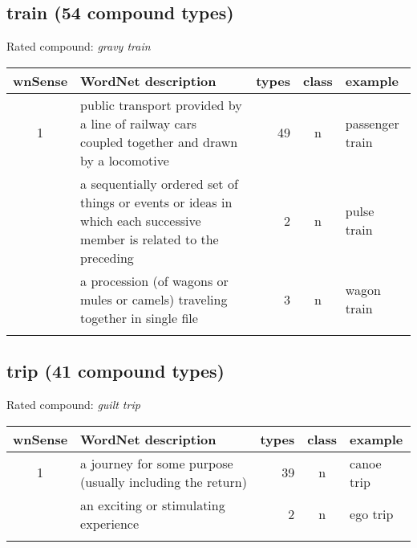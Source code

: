 \subsection{train     (54 compound types)}
Rated compound: \emph{gravy train}
\vspace*{-.3cm}

\noindent
\begin{longtable}{c>{\raggedright\arraybackslash}p{5cm}rc>{\raggedright\arraybackslash}p{2cm}}\lsptoprule
{\small wnSense}&WordNet description&types&class&example\\\midrule
1&public transport provided by a line of railway cars coupled together and drawn by a locomotive&49&n&passenger train\\\tablevspace
2&a sequentially ordered set of things or events or ideas in which each successive member is related to the preceding&2&n&pulse train\\\tablevspace
3&a procession (of wagons or mules or camels) traveling together in single file&3&n&wagon train\\\lspbottomrule
\end{longtable}
\vspace*{-.3cm}
\subsection{trip      (41 compound types)}
Rated compound: \emph{guilt trip}

\vspace*{-.3cm}

\noindent
\begin{longtable}{c>{\raggedright\arraybackslash}p{5cm}rc>{\raggedright\arraybackslash}p{2cm}}\lsptoprule
{\small wnSense}&WordNet description&types&class&example\\\midrule
1&a journey for some purpose (usually including the return)&39&n&canoe trip\\\tablevspace
4&an exciting or stimulating experience&2&n&ego trip\\\lspbottomrule
\end{longtable}


